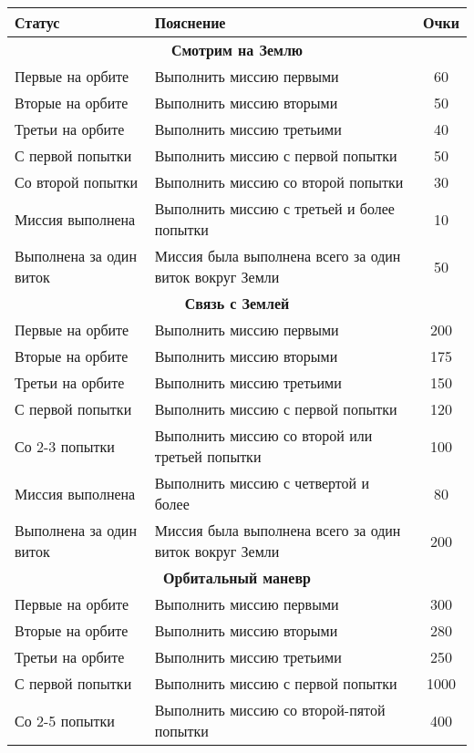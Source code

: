 \documentclass[12pt,a4paper]{article}
\begin{document}
\begin{center}
\begin{longtable}{ |p{5cm}|p{8cm}|c|} 
  \hline
  \textbf{Статус} & \textbf{Пояснение} & \textbf{Очки}\\
  \hline
  \endhead
  \multicolumn{3}{|c|}{\textbf{Смотрим на Землю}}\\
  \hline
  Первые на орбите & Выполнить миссию первыми & 60\\
  \hline
  Вторые на орбите & Выполнить миссию вторыми & 50\\
  \hline
  Третьи на орбите & Выполнить миссию третьими & 40\\
  \hline
  С первой попытки & Выполнить миссию с первой попытки & 50\\
  \hline
  Со второй попытки & Выполнить миссию со второй попытки & 30\\
  \hline
  Миссия выполнена & Выполнить миссию с третьей и более попытки & 10\\
  \hline
  Выполнена за один виток & Миссия была выполнена всего за один виток вокруг Земли & 50\\
  \hline
  \multicolumn{3}{|c|}{\textbf{Связь с Землей}}\\
  \hline
  Первые на орбите & Выполнить миссию первыми & 200\\
  \hline
  Вторые на орбите & Выполнить миссию вторыми & 175\\
  \hline
  Третьи на орбите & Выполнить миссию третьими & 150\\
  \hline
  С первой попытки & Выполнить миссию с первой попытки & 120\\
  \hline
  Со 2-3 попытки & Выполнить миссию со второй или третьей попытки & 100\\
  \hline
  Миссия выполнена & Выполнить миссию с четвертой и более & 80\\
  \hline
  Выполнена за один виток & Миссия была выполнена всего за один виток вокруг Земли & 200\\
  \hline
  \multicolumn{3}{|c|}{\textbf{Орбитальный маневр}}\\
  \hline
  Первые на орбите & Выполнить миссию первыми & 300\\
  \hline
  Вторые на орбите & Выполнить миссию вторыми & 280\\
  \hline
  Третьи на орбите & Выполнить миссию третьими & 250\\
  \hline
  С первой попытки & Выполнить миссию с первой попытки & 1000\\
  \hline
  Со 2-5 попытки & Выполнить миссию со второй-пятой попытки & 400\\

\end{longtable}
\end{center}
\end{document}

